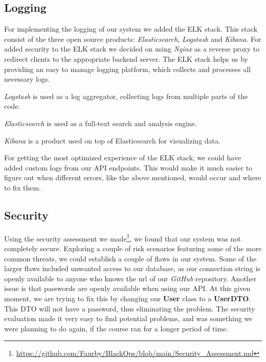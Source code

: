 \subsection{Logging}


For implementing the logging of our system we added the ELK stack. This stack consist of the three open source products: \textit{Elasticsearch}, \textit{Logstash} and \textit{Kibana}. For added security to the ELK stack we decided on using \textit{Nginx} as a reverse proxy to redirect clients to the appropriate backend server. The ELK stack helps us by providing an easy to manage logging platform, which collects and processes all necessary logs.

\textit{Logstash} is used as a log aggregator, collecting logs from multiple parts of the code.

\textit{Elasticsearch} is used as a full-text search and analysis engine. 

\textit{Kibana} is a product used on top of Elasticsearch for visualizing data.

For getting the most optimized experience of the ELK stack, we could have added custom logs from our API endpoints. This would make it much easier to figure out when different errors, like the above mentioned, would occur and where to fix them.

\subsection{Security}

Using the security assessment we made\footnote{\url{https://github.com/Faurby/BlackOps/blob/main/Security\_Assessment.md}}, we found that our system was not completely secure. Exploring a couple of risk scenarios featuring some of the more common threats, we could establish a couple of flaws in our system. Some of the larger flaws included unwanted access to our database, as our connection string is openly available to anyone who knows the url of our \textit{GitHub} repository. Another issue is that passwords are openly available when using our API. At this given moment, we are trying to fix this by changing our \textbf{User} class to a \textbf{UserDTO}. This DTO will not have a password, thus eliminating the problem. The security evaluation made it very easy to find potential problems, and was something we were planning to do again, if the course ran for a longer period of time.

